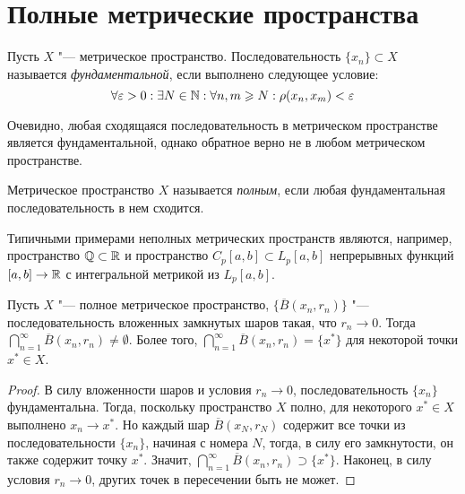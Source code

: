 \section{Полные метрические пространства}

\begin{definition}
    Пусть $X$ "--- метрическое пространство. Последовательность $\{x_n\} \subset X$ называется \textit{фундаментальной}, если выполнено следующее условие:
    \[\forall \varepsilon > 0: \exists N \in \mathbb{N}: \forall n, m \geqslant N: \rho(x_n, x_m) < \varepsilon\]
\end{definition}

\begin{note}
    Очевидно, любая сходящаяся последовательность в метрическом пространстве является фундаментальной, однако обратное верно не в любом метрическом пространстве.
\end{note}

\begin{definition}
    Метрическое пространство $X$ называется \textit{полным}, если любая фундаментальная последовательность в нем сходится.
\end{definition}

\begin{note}
    Типичными примерами неполных метрических пространств являются, например, пространство $\mathbb{Q} \subset \mathbb{R}$ и пространство $C_p[a, b] \subset L_p[a, b]$ непрерывных функций $[a, b] \to \mathbb{R}$ с интегральной метрикой из $L_p[a, b]$.
\end{note}

\begin{theorem}\label{thm2.1}
    Пусть $X$ "--- полное метрическое пространство, $\big\{\overline B(x_n, r_n)\big\}$ "--- последовательность вложенных замкнутых шаров такая, что $r_n \to 0$. Тогда $\bigcap_{n = 1}^\infty \overline B(x_n, r_n) \ne \emptyset$. Более того, $\bigcap_{n = 1}^\infty \overline B(x_n, r_n) = \{x^*\}$ для некоторой точки $x^* \in X$.
\end{theorem}

\begin{proof}
    В силу вложенности шаров и условия $r_n \to 0$, последовательность $\{x_n\}$ фундаментальна. Тогда, поскольку пространство $X$ полно, для некоторого $x^* \in X$ выполнено $x_n \to x^*$. Но каждый шар $\overline B(x_N, r_N)$ содержит все точки из последовательности $\{x_n\}$, начиная с номера $N$, тогда, в силу его замкнутости, он также содержит точку $x^*$. Значит, $\bigcap_{n = 1}^\infty \overline B(x_n, r_n) \supset \{x^*\}$. Наконец, в силу условия $r_n \to 0$, других точек в пересечении быть не может.
\end{proof}

